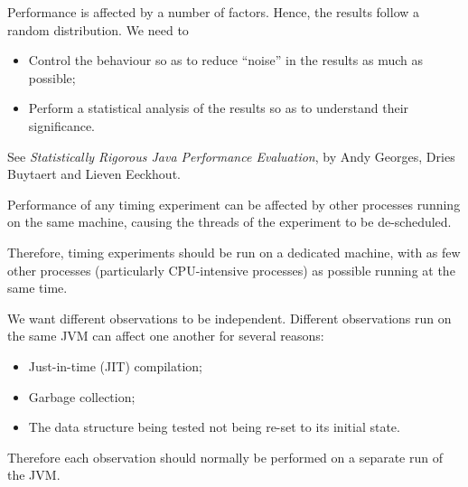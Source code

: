 
\begin{slide}

Performance is affected by a number of factors.  Hence, the results follow a
random distribution.  We need to
%
\begin{itemize}
\item
Control the behaviour so as to reduce ``noise'' in the results as much as
possible;

\item
Perform a statistical analysis of the results so as to understand their
significance.
\end{itemize}

See \emph{Statistically Rigorous Java Performance Evaluation}, by Andy
Georges, Dries Buytaert and Lieven Eeckhout.
\end{slide}


\begin{slide}

Performance of any timing experiment can be affected by other processes
running on the same machine, causing the threads of the experiment to be
de-scheduled. 

Therefore, timing experiments should be run on a dedicated machine, with as
few other processes (particularly CPU-intensive processes) as possible running
at the same time.

\end{slide}


\begin{slide}

We want different observations to be independent.  Different observations run
on the same JVM can affect one another for several reasons:
%
\begin{itemize}
\item
Just-in-time (JIT) compilation;

\item
Garbage collection;


\item
The data structure being tested not being re-set to its initial state.
\end{itemize}
%
Therefore each observation should normally be performed on a separate run of
the JVM.
\end{slide}

